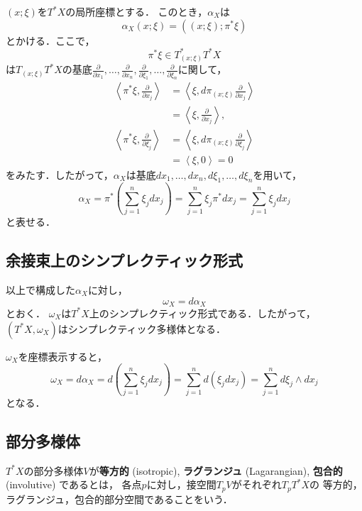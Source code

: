 \documentclass[leqno, 10pt, a4paper, dvipdfmx]{jsarticle}
\theoremstyle{definition}
\numberwithin{equation}{section}
\theoremstyle{mystyle}
\newcommand{\cotb}[1][]{T^{\ast}{#1}}
\begin{document}
\((x;\xi)\)を\(\cotb[X]\)の局所座標とする．
このとき，\(\alpha_X\)は
\[
    \alpha_{X}(x;\xi)=((x;\xi);\pi^{\ast}\xi)
\]
とかける．ここで，\[
    \pi^{\ast}\xi\in T^{\ast}_{(x;\xi)}T^{\ast}X
\]は\(T_{(x;\xi)}T^{\ast}X\)の基底\(
    \frac{\partial}{\partial x_{1}},
    \dots,
    \frac{\partial}{\partial x_{n}},
    \frac{\partial}{\partial \xi_{1}},
    \dots,
    \frac{\partial}{\partial \xi_{n}}
\)に関して，
\begin{align*}
    \left\langle \pi^{\ast}\xi, \frac{\partial}{\partial x_{j}}\right\rangle
    &=
    \left\langle \xi, d\pi_{(x;\xi)}\frac{\partial}{\partial x_{j}}\right\rangle\\
    &=
    \left\langle \xi, \frac{\partial}{\partial x_{j}}\right\rangle,\\
    \left\langle \pi^{\ast}\xi, \frac{\partial}{\partial \xi_{j}}\right\rangle
    &=
    \left\langle \xi, d\pi_{(x;\xi)}\frac{\partial}{\partial \xi_{j}}\right\rangle\\
    &=
    \left\langle \xi, 0\right\rangle=0
\end{align*}
をみたす．したがって，\(\alpha_X\)は基底\(dx_{1},\dots,dx_{n},d\xi_{1},\dots,d\xi_{n}\)を用いて，
\[
    \alpha_X
    =\pi^{\ast}\left(
        \sum_{j=1}^{n}\xi_{j}dx_{j}
    \right)
    =\sum_{j=1}^{n}\xi_{j}\pi^{\ast}dx_{j}
    =\sum_{j=1}^{n}\xi_{j}dx_{j}
\]
と表せる．

\subsection*{余接束上のシンプレクティック形式}
以上で構成した\(\alpha_X\)に対し，\[\omega_X=d\alpha_X\]とおく．
\(\omega_X\)は\(\cotb[X]\)上のシンプレクティック形式である．したがって，
\((\cotb[X],\omega_X)\)はシンプレクティック多様体となる．

\(\omega_X\)を座標表示すると，
\[
    \omega_X=d\alpha_{X}
    =d\left(\sum_{j=1}^{n}\xi_{j}dx_{j}\right)
    =\sum_{j=1}^{n}d(\xi_{j}dx_{j})
    =\sum_{j=1}^{n}d\xi_{j}\wedge dx_{j}
\]
となる．

\subsection*{部分多様体}

\(\cotb[X]\)の部分多様体\(V\)が\textbf{等方的} (isotropic), 
\textbf{ラグランジュ} (Lagarangian), \textbf{包合的} (involutive) 
であるとは，
各点\(p\)に対し，接空間\(T_{p}V\)がそれぞれ\(T_{p}\cotb[X]\)の
等方的，ラグランジュ，包合的部分空間であることをいう．
\end{document}
